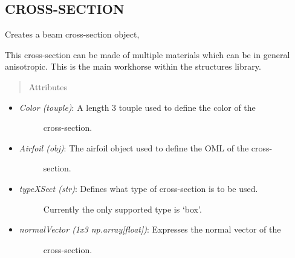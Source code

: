 \documentclass[letterpaper,10pt,english]{sphinxmanual}
\begin{document}
\subsection{CROSS-SECTION}
\label{structures:cross-section}

\begin{fulllineitems}
\label{structures:AeroComBAT.Structures.XSect}
Creates a beam cross-section object,

This cross-section can be made of multiple materials which can be in
general anisotropic. This is the main workhorse within the structures
library.
\begin{quote}\begin{description}
\item[{Attributes}] \leavevmode
\end{description}\end{quote}
\begin{itemize}
\item {} \begin{description}
\item[{\emph{Color (touple)}: A length 3 touple used to define the color of the}] \leavevmode
cross-section.

\end{description}

\item {} \begin{description}
\item[{\emph{Airfoil (obj)}: The airfoil object used to define the OML of the cross-}] \leavevmode
section.

\end{description}

\item {} \begin{description}
\item[{\emph{typeXSect (str)}: Defines what type of cross-section is to be used.}] \leavevmode
Currently the only supported type is `box'.

\end{description}

\item {} \begin{description}
\item[{\emph{normalVector (1x3 np.array{[}float{]})}: Expresses the normal vector of the}] \leavevmode
cross-section.


\end{description}
\end{itemize}
\end{fulllineitems}
\end{document}

